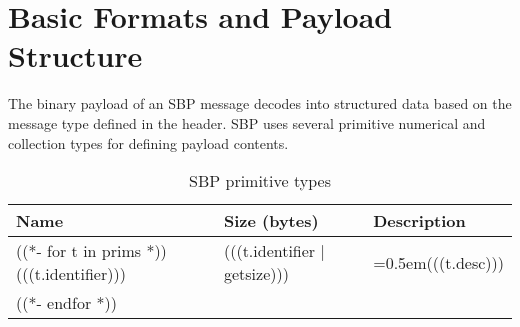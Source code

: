 \documentclass{article}
\numberwithin{table}{subsection}
\numberwithin{field}{subsection}
\begin{document}
\section{Basic Formats and Payload Structure}
\label{sec:Payload}
\begin{large}
The binary payload of an SBP message decodes into structured data
based on the message type defined in the header. SBP uses several
primitive numerical and collection types for defining payload
contents.
\end{large}
\begin{table}[h]
  \centering
  \begin{tabularx}{\textwidth}{aaX}
    \toprule
    Name & Size (bytes) & Description \\
    \midrule
    ((*- for t in prims *))
    (((t.identifier))) & (((t.identifier | getsize))) & \hangindent=0.5em{(((t.desc)))} \\
    ((*- endfor *))
    \bottomrule
  \end{tabularx}
  \caption{SBP primitive types}
  \label{tab:types}
\end{table}
\hspace{-5em}
\end{document}
